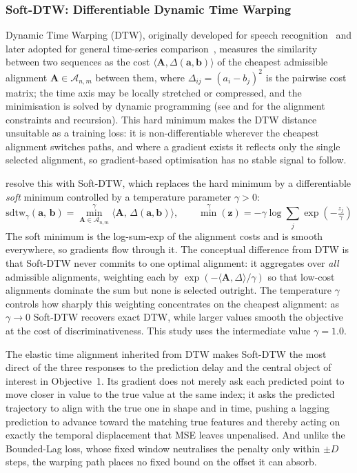 \subsubsection{Soft-DTW: Differentiable Dynamic Time Warping} \label{sec:bg:losses:sdtw}

Dynamic Time Warping (DTW), originally developed for speech recognition~\citep{sakoe1978dtw} and later adopted for general time-series comparison~\citep{berndt1994dtw}, measures the similarity between two sequences as the cost $\langle \mathbf{A}, \Delta(\mathbf{a}, \mathbf{b}) \rangle$ of the cheapest admissible alignment $\mathbf{A} \in \mathcal{A}_{n,m}$ between them, where $\Delta_{ij} = (a_i - b_j)^2$ is the pairwise cost matrix; the time axis may be locally stretched or compressed, and the minimisation is solved by dynamic programming (see \citet{sakoe1978dtw} and \citet{berndt1994dtw} for the alignment constraints and recursion). This hard minimum makes the DTW distance unsuitable as a training loss: it is non-differentiable wherever the cheapest alignment switches paths, and where a gradient exists it reflects only the single selected alignment, so gradient-based optimisation has no stable signal to follow.

\citet{cuturi2017softdtw} resolve this with Soft-DTW, which replaces the hard minimum by a differentiable \emph{soft} minimum controlled by a temperature parameter $\gamma > 0$:
\begin{equation}
    \text{sdtw}_\gamma(\mathbf{a},\, \mathbf{b}) = \min^\gamma_{\mathbf{A} \in \mathcal{A}_{n,m}} \langle \mathbf{A},\, \Delta(\mathbf{a}, \mathbf{b}) \rangle, \qquad
    \min^\gamma(\mathbf{z}) = -\gamma \log \sum_j \exp\!\left(-\tfrac{z_j}{\gamma}\right)
    \label{eq:sdtw}
\end{equation}
The soft minimum is the log-sum-exp of the alignment costs and is smooth everywhere, so gradients flow through it. The conceptual difference from DTW is that Soft-DTW never commits to one optimal alignment: it aggregates over \emph{all} admissible alignments, weighting each by $\exp(-\langle \mathbf{A}, \Delta \rangle / \gamma)$ so that low-cost alignments dominate the sum but none is selected outright. The temperature $\gamma$ controls how sharply this weighting concentrates on the cheapest alignment: as $\gamma \to 0$ Soft-DTW recovers exact DTW, while larger values smooth the objective at the cost of discriminativeness. This study uses the intermediate value $\gamma = 1.0$.

The elastic time alignment inherited from DTW makes Soft-DTW the most direct of the three responses to the prediction delay and the central object of interest in Objective~1. Its gradient does not merely ask each predicted point to move closer in value to the true value at the same index; it asks the predicted trajectory to align with the true one in shape and in time, pushing a lagging prediction to advance toward the matching true features and thereby acting on exactly the temporal displacement that MSE leaves unpenalised. And unlike the Bounded-Lag loss, whose fixed window neutralises the penalty only within $\pm D$ steps, the warping path places no fixed bound on the offset it can absorb.

